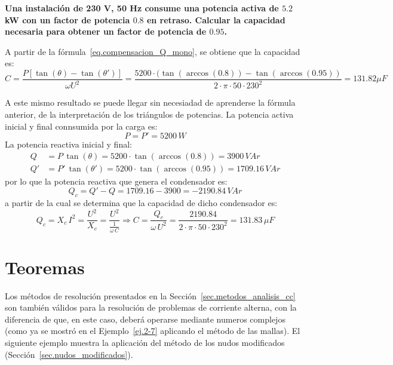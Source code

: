 \documentclass[11pt]{book} %
\begin{document}
	\begin{example}\label{ex.condensador_Q}
	    \textbf{Una instalación de 230 V, 50 Hz consume una potencia activa de $5.2$ kW con un factor de potencia $0.8$ en retraso. Calcular la capacidad necesaria para obtener un factor de potencia de $0.95$.}
	    
	    A partir de la fórmula~\eqref{eq.compensacion_Q_mono}, se obtiene que la capacidad es:
	    \begin{equation*}
	        C=\frac{P \left[\tan (\theta) - \tan (\theta')\right]}{\omega U^2}=\dfrac{5200\cdot(\tan(\arccos(0.8))-\tan(\arccos(0.95))}{2\cdot\pi\cdot 50\cdot 230^2}=131.82\mu F
	    \end{equation*}
	    
	    A este mismo resultado se puede llegar sin necesiadad de aprenderse la fórmula anterior, de la interpretación de los triángulos de potencias. La potencia activa inicial y final connsumida por la carga es:
	    \begin{equation*}
	        P=P'=5200\,W
	    \end{equation*}
	    La potencia reactiva inicial y final:
	    \begin{align*}
	        Q&=P\,\tan(\theta)=5200\cdot\tan(\arccos(0.8))=3900\,VAr\\
	        Q'&=P'\,\tan(\theta')=5200\cdot\tan(\arccos(0.95))=1709.16\,VAr
	    \end{align*}
	    por lo que la potencia reactiva que genera el condensador es: 
	    \begin{equation*}
	        Q_c=Q'-Q=1709.16-3900=-2190.84\,VAr
	    \end{equation*}
	    a partir de la cual se determina que la capacidad de dicho condensador es:
	    \begin{equation*}
	        Q_c=X_c\,I^2=\dfrac{U^2}{X_c}=\dfrac{U^2}{\frac{1}{\omega\,C}}\Rightarrow C=\dfrac{Q_c}{\omega\,U^2}=\dfrac{2190.84}{2\cdot\pi\cdot 50\cdot 230^2}=131.83\,\mu F
	    \end{equation*}
	\end{example}
	
	\section{Teoremas}
	
	Los métodos de resolución presentados en la Sección~\ref{sec.metodos_analisis_cc} son también válidos para la resolución de problemas de corriente alterna, con la diferencia de que, en este caso, deberá operarse mediante numeros complejos (como ya se mostró en el Ejemplo~\ref{ej.2-7} aplicando el método de las mallas). El siguiente ejemplo muestra la aplicación del método de los nudos modificados (Sección~\ref{sec.nudos_modificados}).
	
\end{document}
